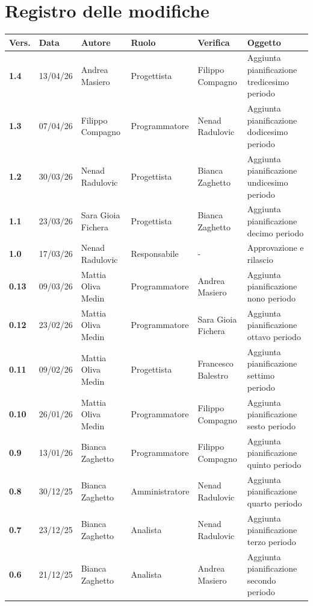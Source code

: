 \documentclass[a4paper,12pt]{article}
\begin{document}


\newpage
\section*{Registro delle modifiche}
\begin{xltabular}{\textwidth}{|l|l|X|l|X|X|}
\hline
\textbf{Vers.} & \textbf{Data} & \textbf{Autore} & \textbf{Ruolo} & \textbf{Verifica} & \textbf{Oggetto} \\
\hline
\endhead
\endfoot
\hline
\endlastfoot
\textbf{1.4} & 13/04/26 & Andrea Masiero & Progettista & Filippo Compagno & Aggiunta pianificazione tredicesimo periodo \\
\hline
\textbf{1.3} & 07/04/26 & Filippo Compagno & Programmatore & Nenad Radulovic & Aggiunta pianificazione dodicesimo periodo \\
\hline
\textbf{1.2} & 30/03/26 & Nenad Radulovic & Progettista & Bianca Zaghetto & Aggiunta pianificazione undicesimo periodo \\
\hline
\textbf{1.1} & 23/03/26 & Sara Gioia Fichera & Progettista & Bianca Zaghetto & Aggiunta pianificazione decimo periodo \\
\hline
\textbf{1.0} & 17/03/26 & Nenad Radulovic & Responsabile & - & Approvazione e rilascio \\
\hline
\textbf{0.13} & 09/03/26 & Mattia Oliva Medin & Programmatore & Andrea Masiero & Aggiunta pianificazione nono periodo \\
\hline
\textbf{0.12} & 23/02/26 & Mattia Oliva Medin & Programmatore & Sara Gioia Fichera & Aggiunta pianificazione ottavo periodo \\
\hline
\textbf{0.11} & 09/02/26 & Mattia Oliva Medin & Progettista & Francesco Balestro & Aggiunta pianificazione settimo periodo \\
\hline
\textbf{0.10} & 26/01/26 & Mattia Oliva Medin & Programmatore & Filippo Compagno & Aggiunta pianificazione sesto periodo \\
\hline
\textbf{0.9} & 13/01/26 & Bianca Zaghetto & Programmatore & Filippo Compagno & Aggiunta pianificazione quinto periodo \\
\hline
\textbf{0.8} & 30/12/25 & Bianca Zaghetto & Amministratore & Nenad Radulovic & Aggiunta pianificazione quarto periodo \\
\hline
\textbf{0.7} & 23/12/25 & Bianca Zaghetto & Analista & Nenad Radulovic & Aggiunta pianificazione terzo periodo \\
\hline
\textbf{0.6} & 21/12/25 & Bianca Zaghetto & Analista & Andrea Masiero & Aggiunta pianificazione secondo periodo \\

\end{xltabular}
\end{document}
